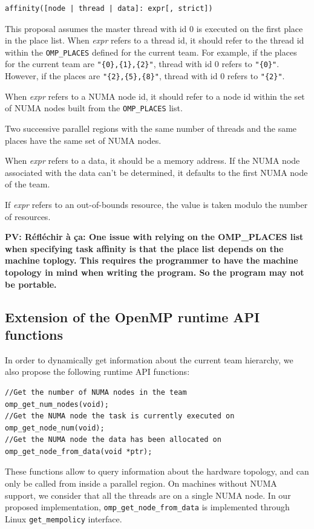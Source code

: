 \documentclass{Styles/llncs}
\newcommand{\PV}[1]{{\color{purple}\bfseries PV: #1}}
\begin{document}
\begin{lstlisting}
affinity([node | thread | data]: expr[, strict])
\end{lstlisting}

This proposal assumes the master thread with id 0 is executed on the first place
in the place list.
When \emph{expr} refers to a thread id, it should refer to the thread id within
the \verb/OMP_PLACES/ defined for the current team. For example, if the places for the
current team are \verb/"{0},{1},{2}"/, thread with id 0 refers to \verb/"{0}"/.
However, if the places are \verb/"{2},{5},{8}"/, thread with id 0 refers to \verb/"{2}"/.

When \emph{expr} refers to a NUMA node id, it should refer to a node id within
the set of NUMA nodes built from the \verb/OMP_PLACES/ list.

Two successive parallel regions with the same number of threads and the same places have
the same set of NUMA nodes.

When \emph{expr} refers to a data, it should be a memory address.
If the NUMA node associated with the data can't be determined, it defaults to the first NUMA node of the team.

If \emph{expr} refers to an out-of-bounds resource, the value is taken modulo the number of resources.

\PV{Réfléchir à ça: One issue with relying on the OMP\_PLACES list when specifying task affinity is that the place list depends on the machine toplogy. This requires the programmer to have the machine topology in mind when writing the program. So the program may not be portable.}

\subsection{Extension of the OpenMP runtime API functions}
In order to dynamically get information about the current team hierarchy, we also propose
the following runtime API functions:
\begin{lstlisting}
//Get the number of NUMA nodes in the team
omp_get_num_nodes(void);
//Get the NUMA node the task is currently executed on
omp_get_node_num(void);
//Get the NUMA node the data has been allocated on
omp_get_node_from_data(void *ptr);
\end{lstlisting}

These functions allow to query information about the hardware topology, and can only be called from inside a parallel region. On machines without NUMA support, we consider that all the threads are on a single NUMA node.
In our proposed implementation, \verb/omp_get_node_from_data/ is implemented through Linux \verb/get_mempolicy/ interface.
\end{document}
